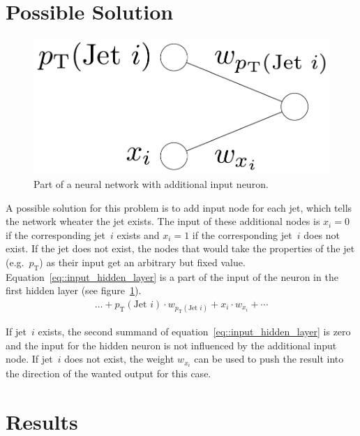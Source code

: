 \documentclass[12pt,a4paper]{article}
\begin{document}
\section{Possible Solution}
\label{sec::Possible_solution}

\begin{figure}
\begin{center}
\includegraphics[scale=0.4]{NN_picture_2.pdf}
\caption{Part of a neural network with additional input neuron.}
\label{fig::NN_picture_2}
\end{center}
\end{figure}

A possible solution for this problem is to add input node for each jet, which tells the network wheater the jet exists. The input of these additional nodes is $x_i = 0$ if the corresponding jet~$i$ exists and $x_i = 1$ if the corresponding jet~$i$ does not exist. If the jet does not exist, the nodes that would take the properties of the jet (e.g.\ $p_\text{T}$) as their input get an arbitrary but fixed value. Equation~\eqref{eq::input_hidden_layer} is a part of the input of the neuron in the first hidden layer (see figure~\ref{fig::NN_picture_2}).
\begin{align}
\dots + p_\text{T}(\text{Jet }i) \cdot w_{p_\text{T}(\text{Jet }i)} + x_i \cdot w_{x_i} + \dotsb \label{eq::input_hidden_layer}
\end{align}

If jet~$i$ exists, the second summand of equation~\eqref{eq::input_hidden_layer} is zero and the input for the hidden neuron is not influenced by the additional input node. If jet~$i$ does not exist, the weight $w_{x_i}$ can be used to push the result into the direction of the wanted output for this case.


\section{Results}
\end{document}
